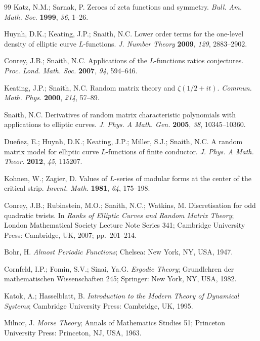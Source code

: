 \documentclass[11pt,reqno]{amsart}
\theoremstyle{remark}
\begin{document}
\begin{thebibliography}{99}
Katz, N.M.; Sarnak, P. Zeroes of zeta functions and symmetry. \emph{Bull. Am. Math. Soc.} \textbf{1999}, \emph{36}, 1--26.

Huynh, D.K.; Keating, J.P.; Snaith, N.C. Lower order terms for the one-level density of elliptic curve $L$-functions. \emph{J. Number Theory} \textbf{2009}, \emph{129}, 2883--2902.

Conrey, J.B.; Snaith, N.C. Applications of the $L$-functions ratios conjectures. \emph{Proc. Lond. Math. Soc.} \textbf{2007}, \emph{94}, 594--646.

Keating, J.P.; Snaith, N.C. Random matrix theory and $\zeta(1/2+it)$. \emph{Commun. Math. Phys.} \textbf{2000}, \emph{214}, 57--89.

Snaith, N.C. Derivatives of random matrix characteristic polynomials with applications to elliptic curves. \emph{J. Phys. A Math. Gen.} \textbf{2005}, \emph{38}, 10345--10360.

Due\~nez, E.; Huynh, D.K.; Keating, J.P.; Miller, S.J.; Snaith, N.C. A random matrix model for elliptic curve $L$-functions of finite conductor. \emph{J. Phys. A Math. Theor.} \textbf{2012}, \emph{45}, 115207.

Kohnen, W.; Zagier, D. Values of $L$-series of modular forms at the center of the critical strip. \emph{Invent. Math.} \textbf{1981}, \emph{64}, 175--198.

Conrey, J.B.; Rubinstein, M.O.; Snaith, N.C.; Watkins, M. Discretisation for odd quadratic twists. In \emph{Ranks of Elliptic Curves and Random Matrix Theory}; London Mathematical Society Lecture Note Series 341; Cambridge University Press: Cambridge, UK, 2007; pp.~201--214.

Bohr, H. \emph{Almost Periodic Functions}; Chelsea: New York, NY, USA, 1947.

Cornfeld, I.P.; Fomin, S.V.; Sinai, Ya.G. \emph{Ergodic Theory}; Grundlehren der mathematischen Wissenschaften 245; Springer: New York, NY, USA, 1982.

Katok, A.; Hasselblatt, B. \emph{Introduction to the Modern Theory of Dynamical Systems}; Cambridge University Press: Cambridge, UK, 1995.

Milnor, J. \emph{Morse Theory}; Annals of Mathematics Studies 51; Princeton University Press: Princeton, NJ, USA, 1963.


\end{thebibliography}
\end{document}
